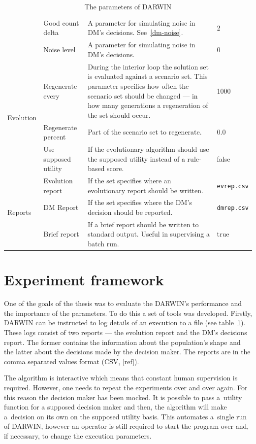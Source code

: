\begin{table}
\begin{tabular}{l l p{7cm} l}
    & Good count delta & A parameter for simulating noise in DM's decisions. See~\ref{dm-noise}. & 2 \\
    & Noise level & A parameter for simulating noise in DM's decisions. & 0 \\
    \hline
    \multirow{3}{*}{Evolution} & Regenerate every & During the interior loop
    the solution set is evaluated against a scenario set. This parameter
    specifies how often the scenario set should be changed --- in how many
    generations a regeneration of the set should occur. & 1000 \\
    & Regenerate percent & Part of the scenario set to regenerate. & 0.0 \\
    & Use supposed utility & If the evolutionary algorithm should use the
    supposed utility instead of a rule-based score. & false \\
    \hline
    \multirow{3}{*}{Reports} & Evolution report & If the set specifies where an
    evolutionary report should be written.  & \texttt{evrep.csv} \\
    & DM Report & If the set specifies where the DM's decision should be reported. & \texttt{dmrep.csv} \\
    &  Brief report & If a brief report should be written to standard
    output. Useful in supervising a batch run. & true \\
    \hline
  \end{tabular}
  \caption{The parameters of DARWIN}
  \label{t:params}
\end{table}


\section{Experiment framework}
One of the goals of the thesis was to evaluate the DARWIN's performance and
the importance of the parameters. To do this a set of tools was
developed. Firstly, DARWIN can be instructed to log details of an execution to
a file (see table~\ref{t:params}). These logs consist of two reports --- the
evolution report and the DM's decisions report. The former contains the
information about the population's shape and the latter about the decisions
made by the decision maker. The reports are in the comma separated values
format (CSV, [ref]).

The algorithm is interactive which means that constant human supervision is
required. However, one needs to repeat the experiments over and over
again. For this reason the decision maker has been mocked. It is possible to
pass a~utility function for a supposed decision maker and then, the algorithm
will make a~decision on its own on the supposed utility basis. This automates
a~single run of DARWIN, however an operator is still required to start the
program over and, if necessary, to change the execution parameters.


